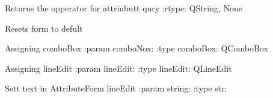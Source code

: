 \documentclass[letterpaper,10pt,english]{sphinxmanual}
\begin{document}
\begin{fulllineitems}
\begin{fulllineitems}
\end{fulllineitems}


\begin{fulllineitems}
\label{\detokenize{code:AttributeForm.AttributeForm.opperator}}
Returns the opperator for attriubutt qury
:rtype: QString, None

\end{fulllineitems}


\begin{fulllineitems}
\label{\detokenize{code:AttributeForm.AttributeForm.reset}}
Resets form to defult

\end{fulllineitems}


\begin{fulllineitems}
\label{\detokenize{code:AttributeForm.AttributeForm.setComboBox}}
Assigning comboBox
:param comboNox:
:type comboBox: QComboBox

\end{fulllineitems}


\begin{fulllineitems}
\label{\detokenize{code:AttributeForm.AttributeForm.setLineEdit}}
Assigning lineEdit
:param lineEdit:
:type lineEdit: QLineEdit

\end{fulllineitems}


\begin{fulllineitems}
\label{\detokenize{code:AttributeForm.AttributeForm.setLineEditText}}
Sett text in AttributeForm lineEdit
:param string:
:type str:

\end{fulllineitems}


\end{fulllineitems}
\end{document}
